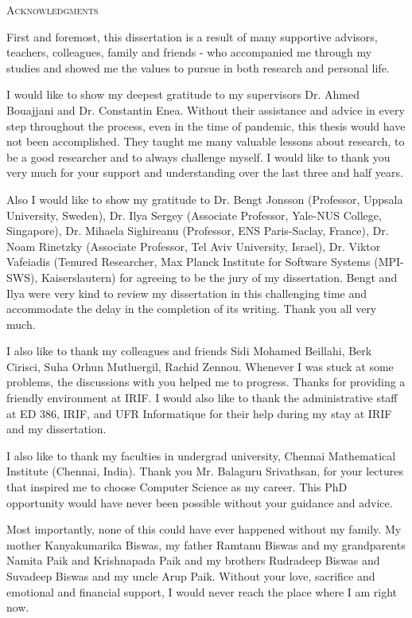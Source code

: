 \begin{center}
    \textsc{Acknowledgments}
  \end{center}
  \noindent

First and foremost, this dissertation is a result of many supportive advisors, teachers, colleagues, family and friends - who accompanied me through my studies and showed me the values to pursue in both research and personal life.

I would like to show my deepest gratitude to my supervisors Dr. Ahmed Bouajjani and Dr. Constantin Enea. Without their assistance and advice in every step throughout the process, even in the time of pandemic, this thesis would have not been accomplished. They taught me many valuable lessons about research, to be a good researcher and to always challenge myself. I would like to thank you very much for your support and understanding over the last three and half years.

Also I would like to show my gratitude to Dr. Bengt Jonsson (Professor, Uppsala University, Sweden), Dr. Ilya Sergey (Associate Professor, Yale-NUS College, Singapore), Dr. Mihaela Sighireanu (Professor, ENS Paris-Saclay, France), Dr. Noam Rinetzky (Associate Professor, Tel Aviv University, Israel), Dr. Viktor Vafeiadis (Tenured Researcher, Max Planck Institute for Software Systems (MPI-SWS), Kaiserslautern) for agreeing to be the jury of my dissertation. Bengt and Ilya were very kind to review my dissertation in this challenging time and accommodate the delay in the completion of its writing. Thank you all very much. 

I also like to thank my colleagues and friends Sidi Mohamed Beillahi, Berk Cirisci, Suha Orhun Mutluergil, Rachid Zennou. Whenever I was stuck at some problems, the discussions with you helped me to progress. Thanks for providing a friendly environment at IRIF. I would also like to thank the administrative staff at ED 386, IRIF, and UFR Informatique for their help during my stay at IRIF and my dissertation.

I also like to thank my faculties in undergrad university, Chennai Mathematical Institute (Chennai, India). Thank you Mr. Balaguru Srivathsan, for your lectures that inspired me to choose Computer Science as my career. This PhD opportunity would have never been possible without your guidance and advice.

Most importantly, none of this could have ever happened without my family. My mother Kanyakumarika Biswas, my father Ramtanu Biswas and my grandparents Namita Paik and Krishnapada Paik and my brothers Rudradeep Biswas and Suvadeep Biswas and my uncle Arup Paik. Without your love, sacrifice and emotional and financial support, I would never reach the place where I am right now.

